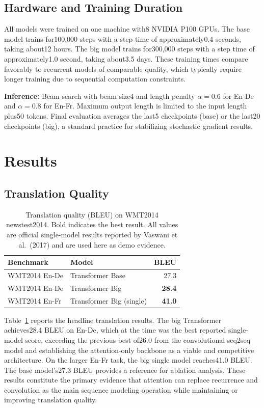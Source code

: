 ﻿\documentclass{article}
\begin{document}
\subsection{Hardware and Training Duration}

All models were trained on one machine with8 NVIDIA P100 GPUs. The base model trains for100,000 steps with a step time of approximately0.4 seconds, taking about12 hours. The big model trains for300,000 steps with a step time of approximately1.0 second, taking about3.5 days. These training times compare favorably to recurrent models of comparable quality, which typically require longer training due to sequential computation constraints.

\textbf{Inference:} Beam search with beam size4 and length penalty $\alpha =0.6$ for En-De and $\alpha =0.8$ for En-Fr. Maximum output length is limited to the input length plus50 tokens. Final evaluation averages the last5 checkpoints (base) or the last20 checkpoints (big), a standard practice for stabilizing stochastic gradient results.

\section{Results}

\subsection{Translation Quality}

\begin{table}[t]
 \centering
 \caption{Translation quality (BLEU) on WMT2014 newstest2014. Bold indicates the best result. All values are official single-model results reported by Vaswani et al.\ (2017) and are used here as demo evidence.}
 \label{tab:bleu}
 \begin{tabular}{l l r}
 \toprule
 Benchmark & Model & BLEU \\
 \midrule
 WMT2014 En-De & Transformer Base &27.3 \\
 WMT2014 En-De & Transformer Big & \textbf{28.4} \\
 WMT2014 En-Fr & Transformer Big (single) & \textbf{41.0} \\
 \bottomrule
 \end{tabular}
\end{table}

Table~\ref{tab:bleu} reports the headline translation results. The big Transformer achieves28.4 BLEU on En-De, which at the time was the best reported single-model score, exceeding the previous best of26.0 from the convolutional seq2seq model and establishing the attention-only backbone as a viable and competitive architecture. On the larger En-Fr task, the big single model reaches41.0 BLEU. The base model's27.3 BLEU provides a reference for ablation analysis. These results constitute the primary evidence that attention can replace recurrence and convolution as the main sequence modeling operation while maintaining or improving translation quality.
\end{document}
